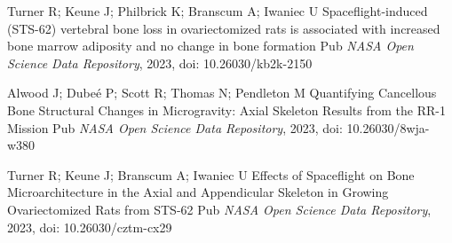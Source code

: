 \documentclass{article}
\begin{document}
\begin{thebibliography}{1}
\bibitem{}
Turner R; Keune J; Philbrick K; Branscum A; Iwaniec U
\newblock Spaceflight-induced (STS-62) vertebral bone loss in ovariectomized rats is associated with increased bone marrow adiposity and no change in bone formation
\newblock Pub {\em NASA Open Science Data Repository}, 2023, doi: 10.26030/kb2k-2150

\bibitem{}
Alwood J; Dubeé P; Scott R; Thomas N; Pendleton M
\newblock Quantifying Cancellous Bone Structural Changes in Microgravity: Axial Skeleton Results from the RR-1 Mission
\newblock Pub {\em NASA Open Science Data Repository}, 2023, doi: 10.26030/8wja-w380

\bibitem{}
Turner R; Keune J; Branscum A; Iwaniec U
\newblock Effects of Spaceflight on Bone Microarchitecture in the Axial and Appendicular Skeleton in Growing Ovariectomized Rats from STS-62
\newblock Pub {\em NASA Open Science Data Repository}, 2023, doi: 10.26030/cztm-cx29


\end{thebibliography}
\end{document}
